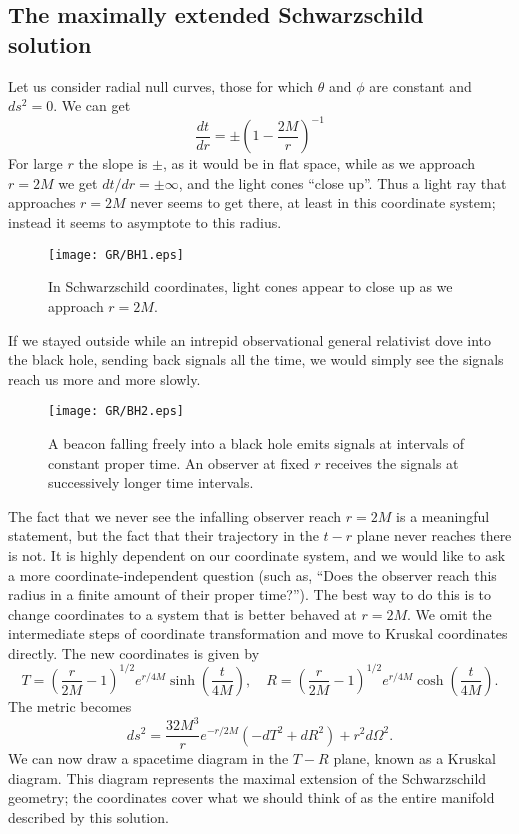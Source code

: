 \documentclass[cyan]{elegantnote}
\begin{document}
\subsection{The maximally extended Schwarzschild solution}
Let us consider radial null curves, those for which $\theta$ and $\phi$ are constant and $ds^2 = 0$. We can get
\[\frac{dt}{dr} = \pm \left(1 -\frac{2M}{r} \right)^{-1}\]
For large $r$ the slope is $\pm$, as it would be in flat space, while as we approach $r = 2M$ we get $dt / dr = \pm \infty$, and the light cones ``close up''. 
Thus a light ray that approaches $r = 2M$ never seems to
get there, at least in this coordinate system; instead it seems to asymptote to this radius.

\begin{figure}[!htb]
\centering
\texttt{[image: GR/BH1.eps]}
\caption{In Schwarzschild coordinates, light cones appear to close up as we approach $r = 2M$.}
\end{figure}

\noindent
If we stayed outside while an intrepid observational general relativist dove into the black hole, sending back
signals all the time, we would simply see the signals reach us more and more slowly.

\begin{figure}[!htb]
\centering
\texttt{[image: GR/BH2.eps]}
\caption{A beacon falling freely into a black hole emits signals at intervals of constant proper time. An observer at fixed $r$ receives the signals at successively longer
time intervals.}
\end{figure}

\noindent
The fact that we never see the infalling observer reach $r = 2M$ is a meaningful statement, but the fact that their trajectory in the $t-r$ plane never reaches there is not. 
It is highly dependent on our coordinate system, and we would like to ask a more coordinate-independent question (such as, ``Does the observer reach this radius in a finite amount of their proper time?''). 
The best way to do this is to change coordinates to a system that is better behaved at $r = 2M$. We omit the intermediate steps of coordinate transformation and move to Kruskal coordinates directly. The new coordinates is given by
\[T = \left( \frac{r}{2M} -1 \right)^{1/2} e^{r/4M}\sinh \left( \frac{t}{4M}\right), \quad R = \left( \frac{r}{2M} -1 \right)^{1/2} e^{r/4M}\cosh\left( \frac{t}{4M}\right).\]
The metric becomes
\[ds^2 = \frac{32M^3}{r}e^{-r/2M}(-dT^2+dR^2) + r^2 d\Omega^2.\]
We can now draw a spacetime diagram in the $T-R$ plane, known as a Kruskal diagram. This diagram represents the maximal extension of the Schwarzschild geometry; the coordinates cover what we should think of as
the entire manifold described by this solution.
\end{document}
